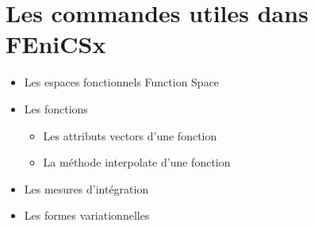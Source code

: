 \documentclass[10pt]{book}
\begin{document}
\section{Les commandes utiles dans FEniCSx}
\begin{itemize}
\item Les espaces fonctionnels Function Space
\item Les fonctions
\begin{itemize}
\item Les attributs vectors d'une fonction
\item La méthode interpolate d'une fonction
\end{itemize}
\item Les mesures d'intégration
\item Les formes variationnelles 
\end{itemize}
\end{document}
